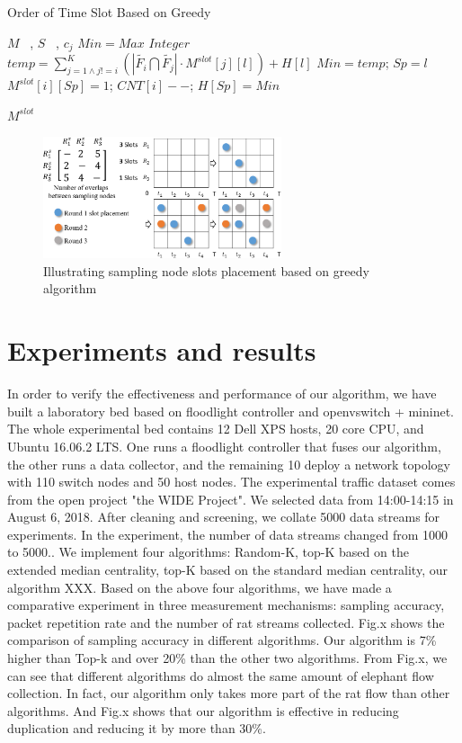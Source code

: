 \documentclass[conference]{IEEEtran}
\begin{document}
\begin{algorithm}[h]
\caption{Order of Time Slot Based on Greedy}
\begin{algorithmic}[1]
\REQUIRE  $M$ ~, $S$ ~, $c_j$
\STATE $Min = Max$ $Integer$
\STATE $temp = \sum^{K}_{j=1 \wedge j != i}(\left| \widetilde{{{F}_{i}}}\bigcap \widetilde{{{F}_{j}}} \right| \cdot M^{slot}[j][l]) + H[l] $
\STATE $Min = temp$; $Sp = l$ 
\ENDIF
\ENDIF
\ENDFOR
\STATE$M^{slot}[i][Sp] = 1$; $ CNT[i]--$; $H[Sp] = Min$
\ENDIF
\ENDFOR
\ENDWHILE

\RETURN $M^{slot}$
\label{code:recentEnd}
\end{algorithmic}
\end{algorithm}

\begin{figure}[!hhhhhhhhhht]
\centering
\includegraphics[width=7cm]{images/greedy_for_order_slot.png}
\caption{Illustrating sampling node slots placement based on greedy algorithm}
\label{slot_order}
\end{figure}

\section{Experiments and results}
In order to verify the effectiveness and performance of our algorithm, we have built a laboratory bed based on floodlight controller and openvswitch + mininet. The whole experimental bed contains 12 Dell XPS hosts, 20 core CPU, and Ubuntu 16.06.2 LTS. One runs a floodlight controller that fuses our algorithm, the other runs a data collector, and the remaining 10 deploy a network topology with 110 switch nodes and 50 host nodes. The experimental traffic dataset comes from the open project "the WIDE Project". We selected data from 14:00-14:15 in August 6, 2018. After cleaning and screening, we collate 5000 data streams for experiments. In the experiment, the number of data streams changed from 1000 to 5000..
We implement four algorithms: Random-K, top-K based on the extended median centrality, top-K based on the standard median centrality, our algorithm XXX. Based on the above four algorithms, we have made a comparative experiment in three measurement mechanisms: sampling accuracy, packet repetition rate and the number of rat streams collected.
Fig.x shows the comparison of sampling accuracy in different algorithms. Our algorithm is 7\% higher than Top-k and over 20\% than the other two algorithms. From Fig.x, we can see that different algorithms do almost the same amount of elephant flow collection. In fact, our algorithm only takes more part of the rat flow than other algorithms. And Fig.x shows that our algorithm is effective in reducing duplication and reducing it by more than 30\%.
\end{document}
